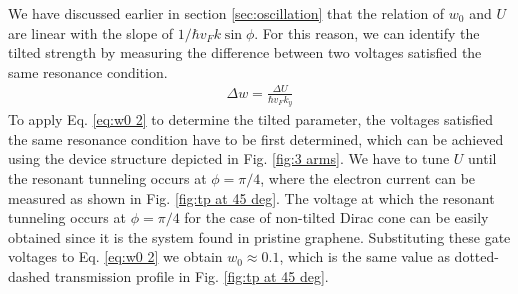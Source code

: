     We have discussed earlier in section \ref{sec:oscillation} that the relation of $w_0$ and $U$ are linear with the slope of $1/\hbar v_F k \sin{\phi}$.
    For this reason, we can identify the tilted strength by measuring the difference between two voltages satisfied the same resonance condition.
    \begin{align} \label{eq:w0 2}
        \Delta w = \frac{\Delta U}{\hbar v_F k_y}
    \end{align}
    To apply Eq. \ref{eq:w0 2} to determine the tilted parameter, the voltages satisfied the same resonance condition have to be first determined,
    which can be achieved using the device structure depicted in Fig. \ref{fig:3 arms}. We have to tune $U$ until the resonant tunneling occurs at $\phi = \pi/4$,
    where the electron current can be measured as shown in Fig. \ref{fig:tp at 45 deg}.
    The voltage at which the resonant tunneling occurs at $\phi = \pi/4$ for the case of non-tilted Dirac cone can be easily obtained since it is the system found in pristine graphene.
    Substituting these gate voltages to Eq. \ref{eq:w0 2} we obtain $w_0 \approx 0.1$, which is the same value as dotted-dashed transmission profile in Fig. \ref{fig:tp at 45 deg}.


